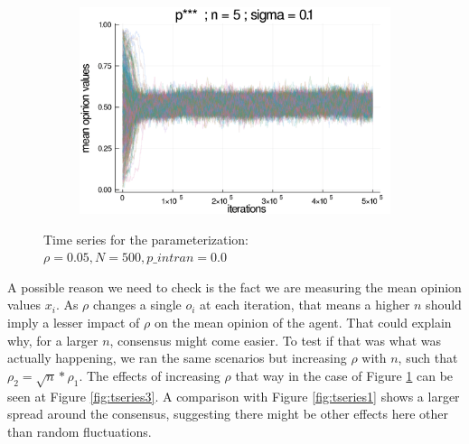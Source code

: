 \documentclass{article}
\begin{document}
\begin{figure}[H]
      \begin{subfigure}[b]{0.48\textwidth}
        \includegraphics[width=\textwidth]{img/series/tseries2/Poodlcalculatepsssn5-rho005-sigma01-00intransrandom.png}
      \end{subfigure}
      \caption{Time series for the parameterization: \(\rho = 0.05, N = 500,
        p\_intran = 0.0\)}
            \label{fig:tseries2}
          \end{figure}
          
    A possible reason we need to check is the fact we are  measuring the mean opinion values \( x_i \).
    As \(\rho\) changes a single \(o_i\) at each iteration, that means a
    higher \(n\) should imply a lesser impact of \(\rho\) on the mean opinion of the
    agent. That could explain why, for a larger $n$, consensus might come easier. To test if that was what was actually happening, we ran the same scenarios but increasing \(\rho\) with \(n\), such that  \(\rho_2
    = \sqrt{n} * \rho_1 \). The effects of increasing \(\rho\) that way in the case of Figure \ref{fig:tseries2} can be seen at Figure \ref{fig:tseries3}. A comparison with Figure \ref{fig:tseries1} shows a larger spread around the consensus, suggesting there might be other effects here other than random fluctuations. 
\end{document}
